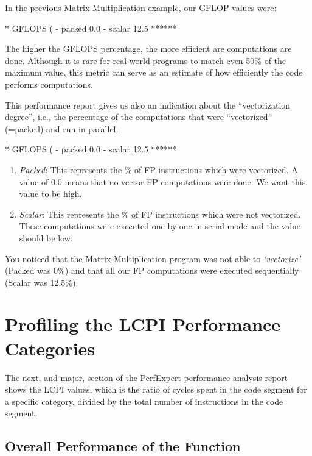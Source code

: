 In the previous Matrix-Multiplication example, our GFLOP values were:
\begin{prompt}
* GFLOPS (%
  - packed                0.0
  - scalar               12.5 ******
\end{prompt}

The higher the GFLOPS percentage, the more efficient are computations are done. Although it is rare for real-world programs to match even 50\% of the maximum value, this metric can serve as an estimate of how efficiently the code performs computations.

This performance report gives us also an indication about the ``vectorization degree'', i.e., the percentage of the computations that were ``vectorized'' (=packed) and run in parallel.

\begin{prompt}
* GFLOPS (%
  - packed                0.0
  - scalar               12.5 ******
\end{prompt}

\begin{enumerate}
  \item  \emph{Packed}: This represents the \% of FP instructions which were vectorized. A value of 0.0 means that no vector FP computations were done. We want this value to be high.
  \item  \emph{Scalar}: This represents the \% of FP instructions which were not vectorized. These computations were executed one by one in serial mode and the value should be low.
\end{enumerate}

You noticed that the Matrix Multiplication program was not able to \emph{`vectorize'} (Packed was 0\%) and that all our FP computations were executed sequentially (Scalar was 12.5\%).

\section{Profiling the LCPI Performance Categories}
\label{sec:Profiling_the_LCPI_Performance_Categories}

The next, and major, section of the PerfExpert performance analysis report shows the LCPI values, which is the ratio of cycles spent in the code segment for a specific category, divided by the total number of instructions in the code segment.

\subsection{Overall Performance of the Function}
\label{subsec:Overall_Performance}

